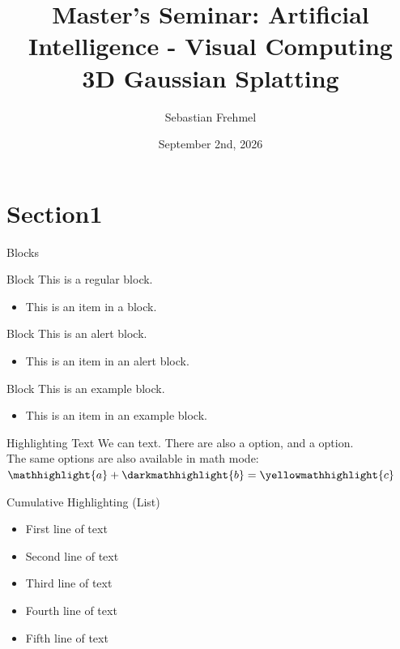 \documentclass[aspectratio=169]{beamer} %
\title[3D Gaussian Splatting]{Master's Seminar: Artificial Intelligence - Visual Computing\\ 3D Gaussian Splatting}
\author[S. Frehmel]{Sebastian Frehmel}
\institute{Artificial Intelligence Group,\\
Fernuniversit\"at Hagen, Germany}
\date{September 2nd, 2026}
\begin{document}

\begin{frame}
  \titlepage
\end{frame}
\nologo

\section{Section1}

\begin{frame}{Blocks}
    \begin{block}{Block}
        This is a regular block.
        \begin{itemize}
            \item This is an item in a block.
        \end{itemize}
    \end{block}
    
    \begin{alertblock}{Block}
        This is an alert block.
        \begin{itemize}
            \item This is an item in an alert block.
        \end{itemize}
    \end{alertblock}
    
    \begin{exampleblock}{Block}
        This is an example block.
        \begin{itemize}
            \item This is an item in an example block.
        \end{itemize}
    \end{exampleblock}
\end{frame}

\begin{frame}{Highlighting Text}
    We can  text. There are also a  option, and a  option.\\
    The same options are also available in math mode: $\mathhighlight{a} + \darkmathhighlight{b} = \yellowmathhighlight{c}$
\end{frame}

\begin{frame}{Cumulative Highlighting (List)}
    \begin{itemize}[<+->]
        \item First line of text
        \item Second line of text
        \item Third line of text
        \item Fourth line of text
        \item Fifth line of text
    \end{itemize}
\end{frame}
\end{document}
